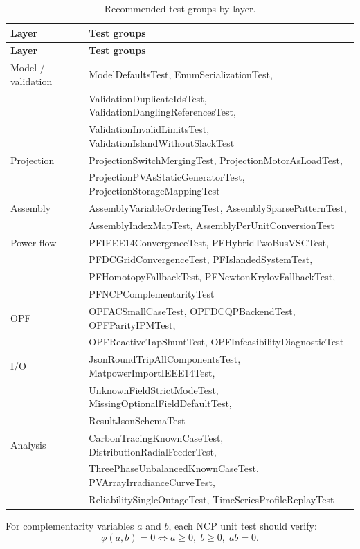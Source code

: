 \begin{longtable}{ll}
\caption{Recommended test groups by layer.\label{tab:test-matrix}} \\
\hline\hline
\textbf{Layer} & \textbf{Test groups} \\
\hline\endfirsthead\hline\hline\textbf{Layer}&\textbf{Test groups}\\\hline\endhead\hline\endfoot
Model / validation & ModelDefaultsTest, EnumSerializationTest, \\
 & ValidationDuplicateIdsTest, ValidationDanglingReferencesTest, \\
 & ValidationInvalidLimitsTest, ValidationIslandWithoutSlackTest \\
Projection & ProjectionSwitchMergingTest, ProjectionMotorAsLoadTest, \\
 & ProjectionPVAsStaticGeneratorTest, ProjectionStorageMappingTest \\
Assembly & AssemblyVariableOrderingTest, AssemblySparsePatternTest, \\
 & AssemblyIndexMapTest, AssemblyPerUnitConversionTest \\
Power flow & PFIEEE14ConvergenceTest, PFHybridTwoBusVSCTest, \\
 & PFDCGridConvergenceTest, PFIslandedSystemTest, \\
 & PFHomotopyFallbackTest, PFNewtonKrylovFallbackTest, \\
 & PFNCPComplementarityTest \\
OPF & OPFACSmallCaseTest, OPFDCQPBackendTest, OPFParityIPMTest, \\
 & OPFReactiveTapShuntTest, OPFInfeasibilityDiagnosticTest \\
I/O & JsonRoundTripAllComponentsTest, MatpowerImportIEEE14Test, \\
 & UnknownFieldStrictModeTest, MissingOptionalFieldDefaultTest, \\
 & ResultJsonSchemaTest \\
Analysis & CarbonTracingKnownCaseTest, DistributionRadialFeederTest, \\
 & ThreePhaseUnbalancedKnownCaseTest, PVArrayIrradianceCurveTest, \\
 & ReliabilitySingleOutageTest, TimeSeriesProfileReplayTest \\
\end{longtable}

For complementarity variables $a$ and $b$, each NCP unit test should verify:
\begin{equation}
  \phi(a,b)=0 \iff a\ge 0,\; b\ge 0,\; ab=0.
\end{equation}

